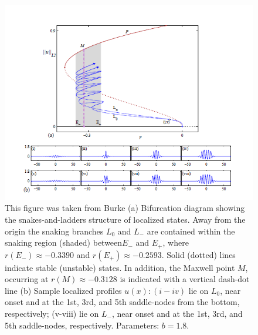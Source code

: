 \documentclass[pre,preprint,superscriptaddress]{revtex4-1}
\begin{document}
\begin{figure}[h]\center
\includegraphics[width=120mm]{BurkeSHE.PNG}
\caption{\label{fig:BurkeSHE}This figure was taken from Burke\cite{} (a) Bifurcation diagram showing the snakes-and-ladders structure of localized states. Away from the origin the snaking branches $L_0$ and $L_-$ are contained within the snaking region (shaded) between$E_-$ and $E_+$, where $r(E_-)\approx -0.3390$ and $r(E_+)\approx -0.2593$.   Solid (dotted) lines indicate stable (unstable) states. In addition, the Maxwell point $M$, occurring at $r(M)\approx -0.3128$  is indicated with a vertical dash-dot line (b) Sample localized profiles $u(x): (i-iv)$ lie on $L_0$, near onset and at the 1st, 3rd, and 5th saddle-nodes from the bottom, respectively; (v-viii) lie on $L_-$, near onset and at the 1st, 3rd, and 5th saddle-nodes, respectively. Parameters: $b = 1.8$.}
\end{figure}
\end{document}
